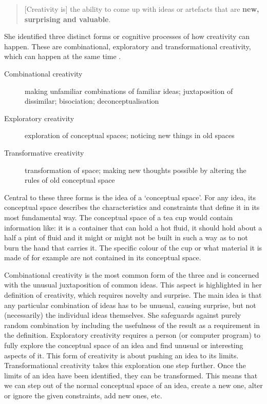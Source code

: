 \begin{quotation}
  [Creativity is] the ability to come up with ideas or artefacts that are \textbf{new, surprising and valuable}. 
\end{quotation}

She identified three distinct forms or cognitive processes of how creativity can happen. These are combinational, exploratory and transformational creativity, which can happen at the same time \autocite{Boden2003}.

\begin{description}
  \item [Combinational creativity] making unfamiliar combinations of familiar ideas; juxtaposition of dissimilar; bisociation; deconceptualisation
  \item [Exploratory creativity] exploration of conceptual spaces; noticing new things in old spaces
  \item [Transformative creativity] transformation of space; making new thoughts possible by altering the rules of old conceptual space
\end{description}

Central to these three forms is the idea of a `conceptual space'. For any idea, its conceptual space describes the characteristics and constraints that define it in its most fundamental way. The conceptual space of a tea cup would contain information like: it is a container that can hold a hot fluid, it should hold about a half a pint of fluid and it might or might not be built in such a way as to not burn the hand that carries it. The specific colour of the cup or what material it is made of for example are not contained in its conceptual space.

Combinational creativity is the most common form of the three and is concerned with the unusual juxtaposition of common ideas. This aspect is highlighted in her definition of creativity, which requires novelty and surprise. The main idea is that any particular combination of ideas has to be unusual, causing surprise, but not (necessarily) the individual ideas themselves. She safeguards against purely random combination by including the usefulness of the result as a requirement in the definition. Exploratory creativity requires a person (or computer program) to fully explore the conceptual space of an idea and find unusual or interesting aspects of it. This form of creativity is about pushing an idea to its limits. Transformational creativity takes this exploration one step further. Once the limits of an idea have been identified, they can be transformed. This means that we can step out of the normal conceptual space of an idea, create a new one, alter or ignore the given constraints, add new ones, etc.


